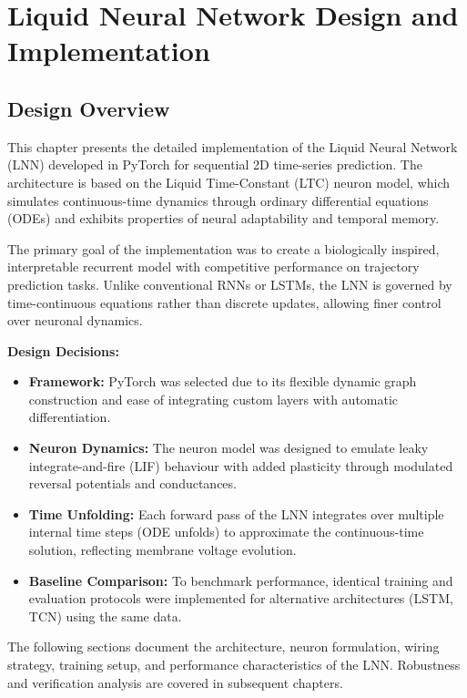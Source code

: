 \chapter{Liquid Neural Network Design and Implementation}

\section{Design Overview}
This chapter presents the detailed implementation of the Liquid Neural Network (LNN) developed in PyTorch for sequential 2D time-series prediction. The architecture is based on the Liquid Time-Constant (LTC) neuron model, which simulates continuous-time dynamics through ordinary differential equations (ODEs) and exhibits properties of neural adaptability and temporal memory.

The primary goal of the implementation was to create a biologically inspired, interpretable recurrent model with competitive performance on trajectory prediction tasks. Unlike conventional RNNs or LSTMs, the LNN is governed by time-continuous equations rather than discrete updates, allowing finer control over neuronal dynamics.

\vspace{1em}
\noindent \textbf{Design Decisions:}
\begin{itemize}
    \item \textbf{Framework:} PyTorch was selected due to its flexible dynamic graph construction and ease of integrating custom layers with automatic differentiation.
    \item \textbf{Neuron Dynamics:} The neuron model was designed to emulate leaky integrate-and-fire (LIF) behaviour with added plasticity through modulated reversal potentials and conductances.
    \item \textbf{Time Unfolding:} Each forward pass of the LNN integrates over multiple internal time steps (ODE unfolds) to approximate the continuous-time solution, reflecting membrane voltage evolution.
    \item \textbf{Baseline Comparison:} To benchmark performance, identical training and evaluation protocols were implemented for alternative architectures (LSTM, TCN) using the same data.
\end{itemize}

The following sections document the architecture, neuron formulation, wiring strategy, training setup, and performance characteristics of the LNN. Robustness and verification analysis are covered in subsequent chapters.

